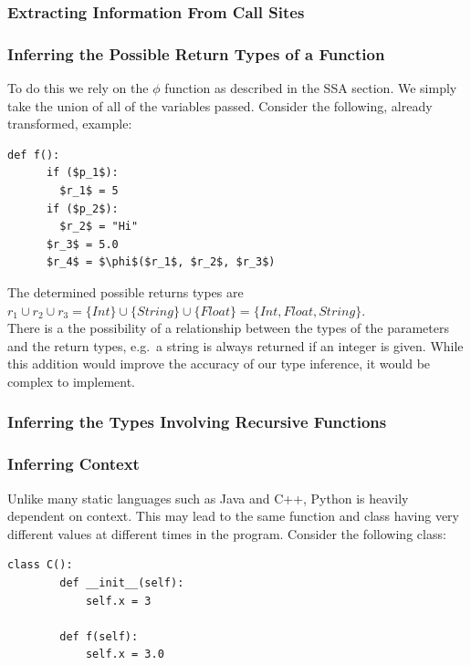 \documentclass[12pt, titlepage]{article}
\begin{document}
\subsubsection{Extracting Information From Call Sites}

\subsubsection{Inferring the Possible Return Types of a Function}
To do this we rely on the $\phi$ function as described in the SSA section. We simply take the union of all of the variables passed. Consider the following, already transformed, example:
\begin{lstlisting}[mathescape]
	def f():
	  if ($p_1$):
	    $r_1$ = 5
	  if ($p_2$):
	    $r_2$ = "Hi"
	  $r_3$ = 5.0
	  $r_4$ = $\phi$($r_1$, $r_2$, $r_3$)
\end{lstlisting}
The determined possible returns types are $r_1 \cup r_2 \cup r_3 = \{Int\} \cup \{String\} \cup \{Float\} = \{Int, Float, String\}$. \\
There is a the possibility of a relationship between the types of the parameters and the return types, e.g.\ a string is always returned if an integer is given. While this addition would improve the accuracy of our type inference, it would be complex to implement.

\subsubsection{Inferring the Types Involving Recursive Functions}


\subsubsection{Inferring Context}
Unlike many static languages such as Java and C++, Python is heavily dependent on context. This may lead to the same function and class having very different values at different times in the program. Consider the following class:
\begin{lstlisting}[mathescape]
	class C():
		def __init__(self):
			self.x = 3
			
		def f(self):
			self.x = 3.0
\end{lstlisting}
\end{document}
